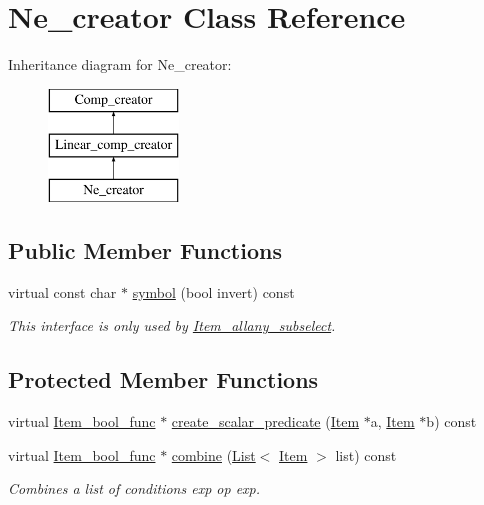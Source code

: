 \hypertarget{classNe__creator}{}\section{Ne\+\_\+creator Class Reference}
\label{classNe__creator}
Inheritance diagram for Ne\+\_\+creator\+:\begin{figure}[H]
\begin{center}
\leavevmode
\includegraphics[height=3.000000cm]{classNe__creator}
\end{center}
\end{figure}
\subsection*{Public Member Functions}
\begin{DoxyCompactItemize}
\item 
\mbox{\label{classNe__creator_a3307fa01686130cab66351f9eb98df20}} 
virtual const char $\ast$ \mbox{\hyperlink{classNe__creator_a3307fa01686130cab66351f9eb98df20}{symbol}} (bool invert) const
\begin{DoxyCompactList}\small\item\em This interface is only used by \mbox{\hyperlink{classItem__allany__subselect}{Item\+\_\+allany\+\_\+subselect}}. \end{DoxyCompactList}\end{DoxyCompactItemize}
\subsection*{Protected Member Functions}
\begin{DoxyCompactItemize}
\item 
virtual \mbox{\hyperlink{classItem__bool__func}{Item\+\_\+bool\+\_\+func}} $\ast$ \mbox{\hyperlink{classNe__creator_a588788bd9c5388d4b11bd206690af928}{create\+\_\+scalar\+\_\+predicate}} (\mbox{\hyperlink{classItem}{Item}} $\ast$a, \mbox{\hyperlink{classItem}{Item}} $\ast$b) const
\item 
\mbox{\label{classNe__creator_ad588dec9ecb9c5346eff58bce3d4e391}} 
virtual \mbox{\hyperlink{classItem__bool__func}{Item\+\_\+bool\+\_\+func}} $\ast$ \mbox{\hyperlink{classNe__creator_ad588dec9ecb9c5346eff58bce3d4e391}{combine}} (\mbox{\hyperlink{classList}{List}}$<$ \mbox{\hyperlink{classItem}{Item}} $>$ list) const
\begin{DoxyCompactList}\small\item\em Combines a list of conditions {\ttfamily exp op exp}. \end{DoxyCompactList}\end{DoxyCompactItemize}


